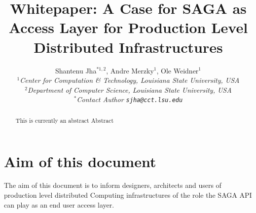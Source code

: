 \documentclass[12pt]{article}
\begin{document}
\title{Whitepaper: A Case for SAGA as Access Layer for Production Level Distributed Infrastructures}

\author{Shantenu Jha$^{*1,2}$, Andre Merzky$^{1}$, Ole Weidner$^{1}$\\
  \small{\emph{$^{1}$Center for Computation \& Technology, Louisiana State University, USA}}\\
  \small{\emph{$^{2}$Department of Computer Science, Louisiana State University, USA}}\\
  \small{\emph{$^{*}$Contact Author \texttt{sjha@cct.lsu.edu}}}
  }

\newif\ifdraft
\drafttrue
\ifdraft
 \newcommand{\amnote}[1]{  {\textcolor{magenta} { ***AM: #1 }}}
 \newcommand{\jhanote}[1]{ {\textcolor{red}     { ***SJ: #1 }}}
 \newcommand{\olenote}[1]{ {\textcolor{blue}    { ***OW: #1 }}}
\else
 \newcommand{\amnote}[1]{}
 \newcommand{\jhanote}[1]{}
 \newcommand{\olenote}[1]{}
\fi

\newcommand{\dn}{\vspace*{0.33em}}
\newcommand{\dnn}{\vspace*{0.66em}}
\newcommand{\dnnn}{\vspace*{1em}}
\newcommand{\uppp}{\vspace*{-1em}}
\newcommand{\upp}{\vspace*{-0.66em}}
\newcommand{\up}{\vspace*{-0.33em}}
\newcommand{\shift}{\hspace*{1.00em}}

\newcommand{\T}[1]{\texttt{#1}}
\newcommand{\I}[1]{\textit{#1}}
\newcommand{\B}[1]{\textbf{#1}}
\newcommand{\BI}[1]{\B{\I{#1}}}
\newcommand{\F}[1]{\B{[FIXME: #1]}}
\newcommand{\TODO}[1]{\textcolor{red}{\B{TODO: #1}}}


\begin{abstract}
This is currently an abstract Abstract
\end{abstract}
\maketitle

\section{Aim of this document}

 The aim of this document is to inform designers, architects and users
 of production level distributed Computing infrastructures of the role
 the SAGA API can play as an end user access layer.
\end{document}
